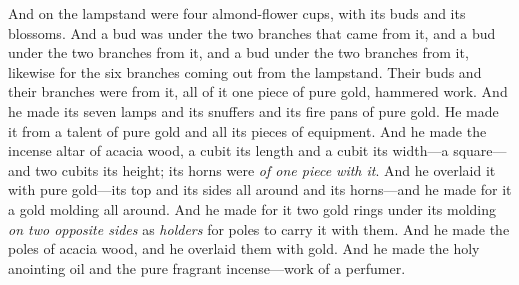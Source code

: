 \begin{biblechapter}
\verse And on the lampstand were four almond-flower cups, with its buds and its blossoms.
\verse And a bud was under the two branches that came from it, and a bud under the two branches from it, and a bud under the two branches from it, likewise for the six branches coming out from the lampstand.
\verse Their buds and their branches were from it, all of it one piece of pure gold, hammered work.
\verse And he made its seven lamps and its snuffers and its fire pans of pure gold.
\verse He made it from a talent of pure gold and all its pieces of equipment.
 And he made the incense altar of acacia wood, a cubit its length and a cubit its width—a square—and two cubits its height; its horns were \textit{of one piece with it}.
\verse And he overlaid it with pure gold—its top and its sides all around and its horns—and he made for it a gold molding all around.
\verse And he made for it two gold rings under its molding \textit{on two opposite sides} as \textit{holders} for poles to carry it with them.
\verse And he made the poles of acacia wood, and he overlaid them with gold.
\verse And he made the holy anointing oil and the pure fragrant incense—work of a perfumer.
\end{biblechapter}

